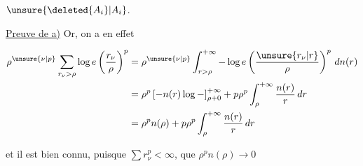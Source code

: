  $\unsure{\deleted{A_i}|A_i}$.


\uline{Preuve de a)} Or, on a en effet


\[
\begin{aligned}
\rho^{\unsure{\nu|p}}\sum_{r_\nu>\rho}\log e\left(\frac{r_\nu}{\rho}\right)^p
&=\rho^{\unsure{\nu|p}}\int_{r>\rho}^{+\infty}-\log e\left(\frac{\unsure{r_\nu|r}}{\rho}\right)^p\,dn(r)\\
&=\rho^p\left[-n(r)\log-\right]_{\rho+0}^{+\infty}
+p\rho^p\int_\rho^{+\infty}\frac{n(r)}{r}\,dr\\
&=\rho^p n(\rho)+p\rho^p\int_\rho^{+\infty}\frac{n(r)}{r}\,dr
\end{aligned}
\]

et il est bien connu, puisque $\sum r_\nu^p<\infty$, que $\rho^p n(\rho)\to0$
